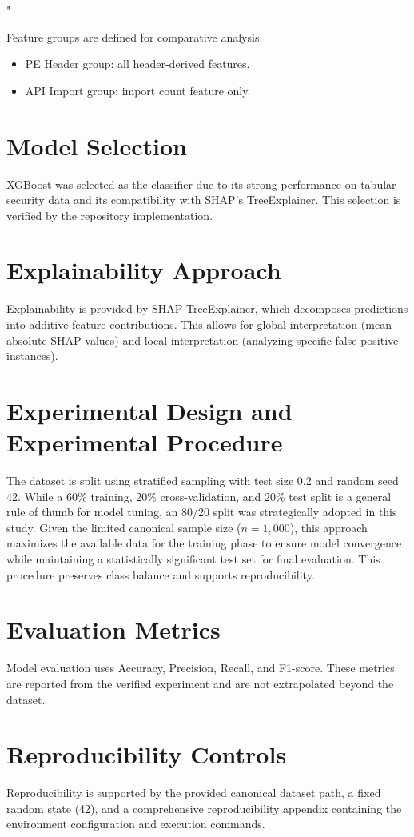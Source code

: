 "\documentclass[conference]{IEEEtran}
\begin{document}
Feature groups are defined for comparative analysis:
\begin{itemize}
    \item PE Header group: all header-derived features.
    \item API Import group: import count feature only.
\end{itemize}

\section{Model Selection}
XGBoost was selected as the classifier due to its strong performance on tabular security data and its compatibility with SHAP's TreeExplainer. This selection is verified by the repository implementation.

\section{Explainability Approach}
Explainability is provided by SHAP TreeExplainer, which decomposes predictions into additive feature contributions. This allows for global interpretation (mean absolute SHAP values) and local interpretation (analyzing specific false positive instances).

\section{Experimental Design and Experimental Procedure}
The dataset is split using stratified sampling with test size 0.2 and random seed 42. While a 60\% training, 20\% cross-validation, and 20\% test split is a general rule of thumb for model tuning, an 80/20 split was strategically adopted in this study. Given the limited canonical sample size ($n=1,000$), this approach maximizes the available data for the training phase to ensure model convergence while maintaining a statistically significant test set for final evaluation. This procedure preserves class balance and supports reproducibility.

\section{Evaluation Metrics}
Model evaluation uses Accuracy, Precision, Recall, and F1-score. These metrics are reported from the verified experiment and are not extrapolated beyond the dataset.

\section{Reproducibility Controls}
Reproducibility is supported by the provided canonical dataset path, a fixed random state (42), and a comprehensive reproducibility appendix containing the environment configuration and execution commands.
\end{document}
